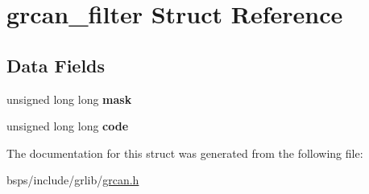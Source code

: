 \hypertarget{structgrcan__filter}{}\section{grcan\+\_\+filter Struct Reference}
\label{structgrcan__filter}
\subsection*{Data Fields}
\begin{DoxyCompactItemize}
\item 
\mbox{\label{structgrcan__filter_a528d6d1b518dea4d7e84fb20bc868e96}} 
unsigned long long {\bfseries mask}
\item 
\mbox{\label{structgrcan__filter_af39d48f2e9fe243794d25f7f8a71cecd}} 
unsigned long long {\bfseries code}
\end{DoxyCompactItemize}


The documentation for this struct was generated from the following file\+:\begin{DoxyCompactItemize}
\item 
bsps/include/grlib/\mbox{\hyperlink{grcan_8h}{grcan.\+h}}\end{DoxyCompactItemize}
